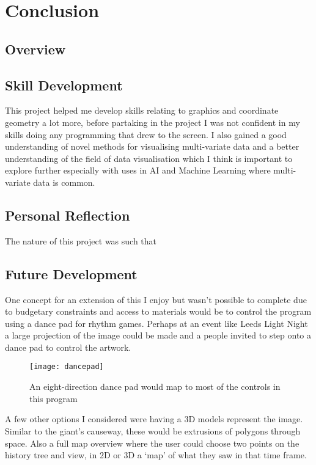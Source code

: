\chapter{Conclusion}
\section{Overview}

\section{Skill Development}
This project helped me develop skills relating to graphics and coordinate
geometry a lot more, before partaking in the project I was not confident in my
skills doing any programming that drew to the screen. I also gained a good
understanding of novel methods for visualising multi-variate data and a better
understanding of the field of data visualisation which I think is important to
explore further especially with uses in AI and Machine Learning where
multi-variate data is common.

\section{Personal Reflection}
The nature of this project was such that

\section{Future Development}
One concept for an extension of this I enjoy but wasn't possible to complete due
to budgetary constraints and access to materials would be to control the program
using a dance pad for rhythm games. Perhaps at an event like Leeds Light Night a
large projection of the image could be made and a people invited to step onto a
dance pad to control the artwork.

\begin{figure}[H]
    \centering
    \texttt{[image: dancepad]}
    \caption{An eight-direction dance pad would map to most of the controls in
    this program}
\end{figure}

A few other options I considered were having a 3D models represent the image.
Similar to the giant's causeway, these would be extrusions of polygons through
space. Also a full map overview where the user could choose two points on the
history tree and view, in 2D or 3D a `map' of what they saw in that time frame.

